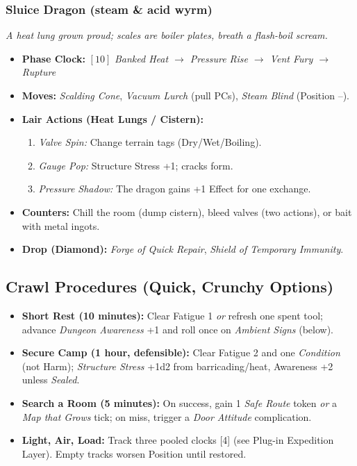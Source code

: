 \subsubsection*{Sluice Dragon (steam \& acid wyrm)}
\textit{A heat lung grown proud; scales are boiler plates, breath a flash-boil scream.}
\begin{itemize}
  \item \textbf{Phase Clock:} \([10]\) \emph{Banked Heat \(\rightarrow\) Pressure Rise \(\rightarrow\) Vent Fury \(\rightarrow\) Rupture}
  \item \textbf{Moves:} \emph{Scalding Cone}, \emph{Vacuum Lurch} (pull PCs), \emph{Steam Blind} (Position --).
  \item \textbf{Lair Actions (Heat Lungs / Cistern):}
  \begin{enumerate}\item \emph{Valve Spin:} Change terrain tags (Dry/Wet/Boiling).\item \emph{Gauge Pop:} Structure Stress +1; cracks form.\item \emph{Pressure Shadow:} The dragon gains +1 Effect for one exchange. \end{enumerate}
  \item \textbf{Counters:} Chill the room (dump cistern), bleed valves (two actions), or bait with metal ingots.
  \item \textbf{Drop (Diamond):} \emph{Forge of Quick Repair}, \emph{Shield of Temporary Immunity}.
\end{itemize}

\subsection*{Crawl Procedures (Quick, Crunchy Options)}
\label{sec:dungeon-crawl-proc}
\begin{itemize}
  \item \textbf{Short Rest (10 minutes):} Clear Fatigue 1 \emph{or} refresh one spent tool; advance \emph{Dungeon Awareness} +1 and roll once on \emph{Ambient Signs} (below).
  \item \textbf{Secure Camp (1 hour, defensible):} Clear Fatigue 2 and one \emph{Condition} (not Harm); \emph{Structure Stress} +1d2 from barricading/heat, Awareness +2 unless \emph{Sealed}.
  \item \textbf{Search a Room (5 minutes):} On success, gain 1 \emph{Safe Route} token \emph{or} a \emph{Map that Grows} tick; on miss, trigger a \emph{Door Attitude} complication.
  \item \textbf{Light, Air, Load:} Track three pooled clocks [4] (see Plug-in Expedition Layer). Empty tracks worsen Position until restored.
\end{itemize}

